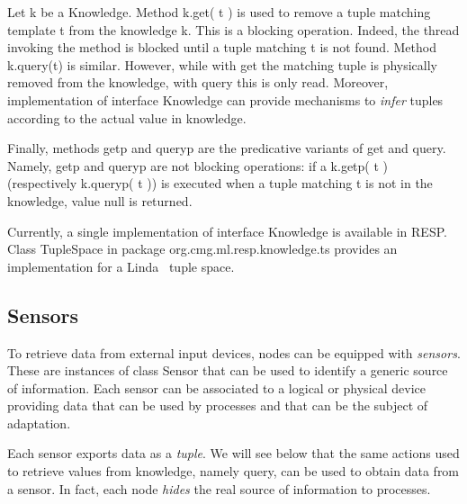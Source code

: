 \documentclass[11pt]{article}
\newcommand{\resp}{\textsf{RESP}}
\newcommand{\resppackage}[1]{\textsf{org.cmg.ml.resp.#1}}
\begin{document}
Let \textsf{k} be a \textsf{Knowledge}. Method \textsf{k.get( t )} is used to remove a tuple matching template \textsf{t} 
from the knowledge \textsf{k}. This is a blocking operation. Indeed, the thread invoking the method is blocked
until a tuple matching \textsf{t} is not found. Method \textsf{k.query(t)} is similar. However, while with \textsf{get}
the matching tuple is physically removed from the knowledge, with \textsf{query} this is only read. Moreover,
implementation of interface \textsf{Knowledge} can provide mechanisms to \emph{infer} tuples according to
the actual value in knowledge. 

Finally, methods \textsf{getp} and \textsf{queryp} are the predicative variants of \textsf{get} and \textsf{query}.
Namely, \textsf{getp} and \textsf{queryp} are not blocking operations: if a \textsf{k.getp( t )} (respectively \textsf{k.queryp( t )}) is 
executed when a tuple matching \textsf{t} is not in the knowledge, value \textsf{null} is returned.  

Currently, a single implementation of interface \textsf{Knowledge} is available in \resp{}. Class
\textsf{TupleSpace} in package \resppackage{knowledge.ts} provides an implementation
for a Linda~\cite{Gel85} tuple space. 

\subsection{Sensors} 
\label{sec:sensors}

To retrieve data from external input devices, nodes can be equipped with \emph{sensors}. These
are instances of class \textsf{Sensor} that can be used to identify a generic source of information.
%
Each sensor can be associated to a logical or physical device providing data that
can be used by processes and that can be the subject of adaptation.

Each sensor exports data as a \emph{tuple}. We will see below that the same actions used 
to retrieve values from knowledge, namely \textsf{query}, can be used to obtain data from a 
sensor. In fact, each node \emph{hides} the real source of information to processes.

\end{document}
